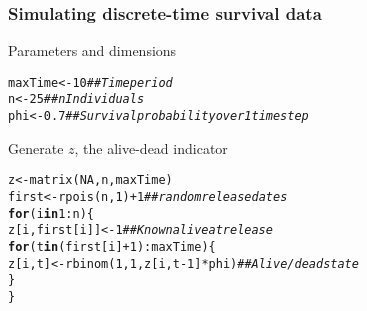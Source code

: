 \documentclass[color=usenames,dvipsnames]{beamer}\usepackage[]{graphicx}\usepackage[]{xcolor}
\makeatletter
\newcommand{\hlnum}[1]{\textcolor[rgb]{0.69,0.494,0}{#1}}%
\newcommand{\hlcom}[1]{\textcolor[rgb]{0.514,0.506,0.514}{\textit{#1}}}%
\newcommand{\hlopt}[1]{\textcolor[rgb]{0,0,0}{#1}}%
\newcommand{\hldef}[1]{\textcolor[rgb]{0,0,0}{#1}}%
\newcommand{\hlkwa}[1]{\textcolor[rgb]{0,0,0}{\textbf{#1}}}%
\newcommand{\hlkwb}[1]{\textcolor[rgb]{0,0.341,0.682}{#1}}%
\newcommand{\hlkwd}[1]{\textcolor[rgb]{0.004,0.004,0.506}{#1}}%
\newenvironment{kframe}{%
 \def\at@end@of@kframe{}%
 \ifinner\ifhmode%
  \def\at@end@of@kframe{\end{minipage}}%
  \begin{minipage}{\columnwidth}%
 \fi\fi%
 \def\FrameCommand##1{\hskip\@totalleftmargin \hskip-\fboxsep
 \colorbox{shadecolor}{##1}\hskip-\fboxsep
     \hskip-\linewidth \hskip-\@totalleftmargin \hskip\columnwidth}%
 \MakeFramed {\advance\hsize-\width
   \@totalleftmargin\z@ \linewidth\hsize
   \@setminipage}}%
 {\par\unskip\endMakeFramed%
 \at@end@of@kframe}
\newenvironment{knitrout}{}{} %
\makeatother
\begin{document}







\begin{frame}[fragile]
  \frametitle{Simulating discrete-time survival data}
  {%
    Parameters and dimensions}
\begin{knitrout}\footnotesize
{}\color{fgcolor}\begin{kframe}
\begin{alltt}
\hldef{maxTime} \hlkwb{<-} \hlnum{10}           \hlcom{## Time period}
\hldef{n} \hlkwb{<-} \hlnum{25}                 \hlcom{## nIndividuals}
\hldef{phi} \hlkwb{<-} \hlnum{0.7}              \hlcom{## Survival probability over 1 time step}
\end{alltt}
\end{kframe}
\end{knitrout}
\pause
\vfill
{%
  Generate $z$, the alive-dead indicator}
\begin{knitrout}\footnotesize
{}\color{fgcolor}\begin{kframe}
\begin{alltt}
\hldef{z} \hlkwb{<-} \hlkwd{matrix}\hldef{(}\hlnum{NA}\hldef{, n, maxTime)}
\hldef{first} \hlkwb{<-} \hlkwd{rpois}\hldef{(n,} \hlnum{1}\hldef{)}\hlopt{+}\hlnum{1}  \hlcom{## random release dates}
\hlkwa{for}\hldef{(i} \hlkwa{in} \hlnum{1}\hlopt{:}\hldef{n) \{}
    \hldef{z[i,first[i]]} \hlkwb{<-} \hlnum{1}  \hlcom{## Known alive at release}
    \hlkwa{for}\hldef{(t} \hlkwa{in} \hldef{(first[i]}\hlopt{+}\hlnum{1}\hldef{)}\hlopt{:}\hldef{maxTime) \{}
        \hldef{z[i,t]} \hlkwb{<-} \hlkwd{rbinom}\hldef{(}\hlnum{1}\hldef{,} \hlnum{1}\hldef{, z[i,t}\hlopt{-}\hlnum{1}\hldef{]}\hlopt{*}\hldef{phi)} \hlcom{## Alive/dead state}
    \hldef{\}}
\hldef{\}}
\end{alltt}
\end{kframe}
\end{knitrout}
\end{frame}
\end{document}
